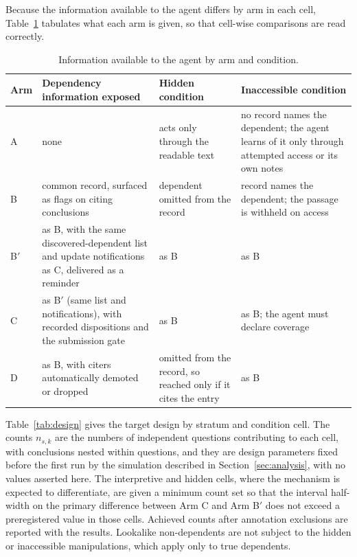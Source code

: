 \documentclass[11pt]{article}
\begin{document}
Because the information available to the agent differs by arm in each cell, Table~\ref{tab:info} tabulates what each arm is given, so that cell-wise comparisons are read correctly.

\begin{table}[ht]
\centering\small
\begin{tabular}{@{}p{}p{}p{}p{}@{}}
\toprule
Arm & Dependency information exposed & Hidden condition & Inaccessible condition \\
\midrule
A & none & acts only through the readable text & no record names the dependent; the agent learns of it only through attempted access or its own notes \\
B & common record, surfaced as flags on citing conclusions & dependent omitted from the record & record names the dependent; the passage is withheld on access \\
B$'$ & as B, with the same discovered-dependent list and update notifications as C, delivered as a reminder & as B & as B \\
C & as B$'$ (same list and notifications), with recorded dispositions and the submission gate & as B & as B; the agent must declare coverage \\
D & as B, with citers automatically demoted or dropped & omitted from the record, so reached only if it cites the entry & as B \\
\bottomrule
\end{tabular}
\caption{Information available to the agent by arm and condition.}\label{tab:info}
\end{table}

Table~\ref{tab:design} gives the target design by stratum and condition cell. The counts $n_{s,k}$ are the numbers of independent questions contributing to each cell, with conclusions nested within questions, and they are design parameters fixed before the first run by the simulation described in Section~\ref{sec:analysis}, with no values asserted here. The interpretive and hidden cells, where the mechanism is expected to differentiate, are given a minimum count set so that the interval half-width on the primary difference between Arm C and Arm B$'$ does not exceed a preregistered value in those cells. Achieved counts after annotation exclusions are reported with the results. Lookalike non-dependents are not subject to the hidden or inaccessible manipulations, which apply only to true dependents.
\end{document}
